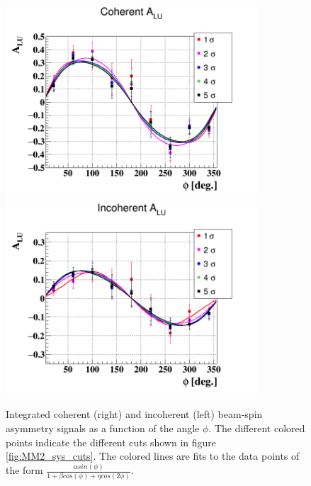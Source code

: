 \begin{figure}[tbp]
   \includegraphics[height=7.2cm]{fig/BSA_Coherent_sigmas.png}
   \includegraphics[height=7.2cm]{fig/BSA_InCoherent_sigmas.png}
   \caption{ Integrated coherent (right) and incoherent (left) beam-spin 
asymmetry signals as a function of the angle $\phi$. The different colored 
points indicate the different cuts shown in figure \ref{fig:MM2_sys_cuts}. The 
colored lines are fits to the data points of the form $\frac{\alpha 
sin(\phi)}{1 + \beta cos(\phi) + \eta cos(2\phi)}$. }
\label{fig:alu_phi_sigmas}
\end{figure}


